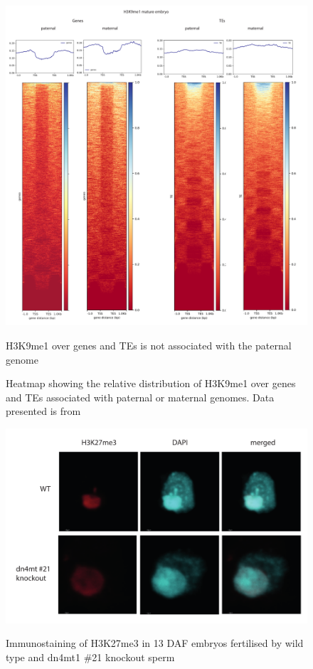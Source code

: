 \begin{figure}[htbp!] 
\centering    
    \includegraphics[width=1\textwidth]{Chapter3/Figs/Supps/FigureS5_H3k9me1.pdf}
\caption{H3K9me1 over genes and TEs is not associated with the paternal genome}
\label{fig:h3k8me1}
\captionsetup{font=small}
    \caption*{Heatmap showing the relative distribution of H3K9me1 over genes and TEs associated with paternal or maternal genomes. Data presented is from \cite{RN160}}
\end{figure}

\begin{figure}[htbp!] 
\centering    
    \includegraphics[width=1\textwidth]{Chapter3/Figs/Supps/FigureS1_immunostaining.pdf}
\caption{Immunostaining of H3K27me3 in 13 DAF embryos fertilised by wild type and dn4mt1 \#21 knockout sperm }
\label{fig:immuno}
\captionsetup{font=small}
    \caption*{}
\end{figure}

